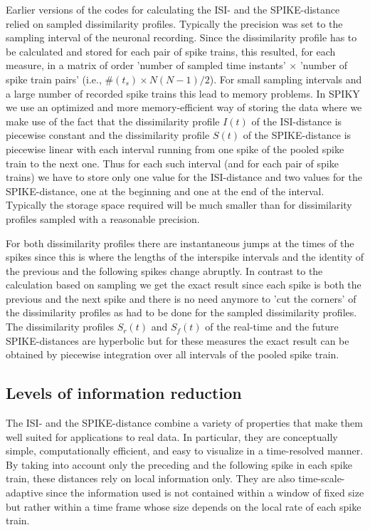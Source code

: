 \documentclass[10pt,twocolumn]{elsart5p}
\begin{document}
Earlier versions of the codes for calculating the ISI- and the SPIKE-distance relied on sampled dissimilarity profiles. Typically the precision was set to the sampling interval of the neuronal recording. Since the dissimilarity profile has to be calculated and stored for each pair of spike trains, this resulted, for each measure, in a matrix of order 'number of sampled time instants' $\times$ 'number of spike train pairs' (i.e., $\# (t_s) \times N(N-1)/2$). For small sampling intervals and a large number of recorded spike trains this lead to memory problems.
In SPIKY we use an optimized and more memory-efficient way of storing the data where we make use of the fact that the dissimilarity profile $I (t)$ of the ISI-distance is piecewise constant and the dissimilarity profile $S (t)$ of the SPIKE-distance is piecewise linear with each interval running from one spike of the pooled spike train to the next one. Thus for each such interval (and for each pair of spike trains) we have to store only one value for the ISI-distance and two values for the SPIKE-distance, one at the beginning and one at the end of the interval. Typically the storage space required will be much smaller than for dissimilarity profiles sampled with a reasonable precision.

For both dissimilarity profiles there are instantaneous jumps at the times of the spikes since this is where the lengths of the interspike intervals and the identity of the previous and the following spikes change abruptly. In contrast to the calculation based on sampling we get the exact result since each spike is both the previous and the next spike and there is no need anymore to 'cut the corners' of the dissimilarity profiles as had to be done for the sampled dissimilarity profiles. The dissimilarity profiles $S_r(t)$ and $S_f (t)$ of the real-time and the future SPIKE-distances are hyperbolic but for these measures the exact result can be obtained by piecewise integration over all intervals of the pooled spike train.


\subsection{\label{ss:Information-reduction} Levels of information reduction}

The ISI- and the SPIKE-distance combine a variety of properties that make them well suited for applications to real data. In particular, they are conceptually simple, computationally efficient, and easy to visualize in a time-resolved manner. By taking into account only the preceding and the following spike in each spike train, these distances rely on local information only. They are also time-scale-adaptive since the information used is not contained within a window of fixed size but rather within a time frame whose size depends on the local rate of each spike train.
\end{document}
